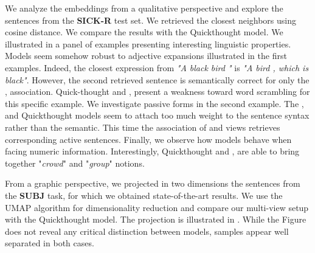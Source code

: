 We analyze the embeddings from a qualitative perspective and explore the sentences from the \textbf{SICK-R} test set. We retrieved the closest neighbors using cosine distance. We compare the results with the Quickthought model. We illustrated in  a panel of examples presenting interesting linguistic properties. Models seem somehow robust to adjective expansions illustrated in the first examples. Indeed, the closest expression from \textit{"A black bird "} is \textit{"A bird , which is black"}. However, the second retrieved sentence is semantically correct for only the \const, \seq association. Quick-thought and \dep, \const present a weakness toward word scrambling for this specific example. We investigate passive forms in the second example. The \const, \seq and Quickthought models seem to attach too much weight to the sentence syntax rather than the semantic. This time the association of \dep and \const views retrieves  corresponding active sentences. Finally, we observe how models behave when facing numeric information. Interestingly, Quickthought and \dep, \const are able to bring together "\textit{crowd}" and "\textit{group}" notions.

From a graphic perspective, we projected in two dimensions the sentences from the \textbf{SUBJ} task, for which we obtained state-of-the-art results. We use the UMAP \parencite{mcinnes_18} algorithm for dimensionality reduction and compare our multi-view setup with the Quickthought model. The projection is illustrated in . While the Figure does not reveal any critical distinction between models, samples appear well separated in both cases.


